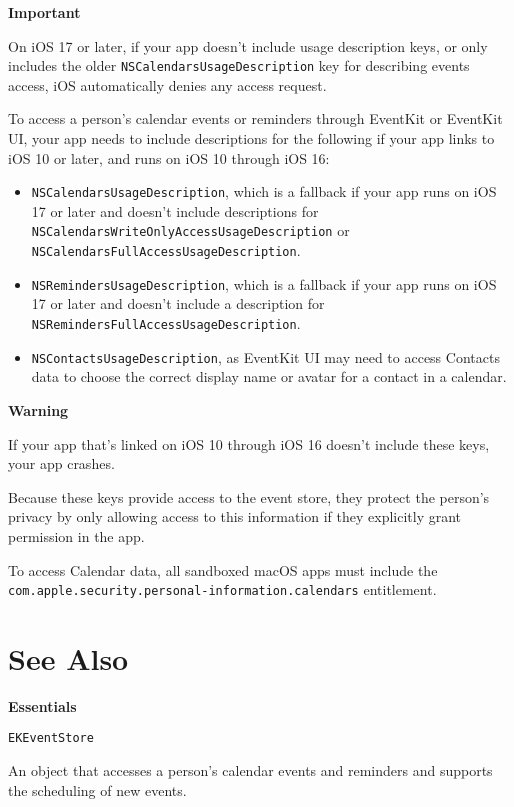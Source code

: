 \documentclass{article}
\begin{document}
\textbf{Important}

On iOS 17 or later, if your app doesn't include usage description keys, or only includes the older \texttt{NSCalendarsUsageDescription} key for describing events access, iOS automatically denies any access request.

To access a person's calendar events or reminders through EventKit or EventKit UI, your app needs to include descriptions for the following if your app links to iOS 10 or later, and runs on iOS 10 through iOS 16:

\begin{itemize}
    \item \texttt{NSCalendarsUsageDescription}, which is a fallback if your app runs on iOS 17 or later and doesn't include descriptions for \texttt{NSCalendarsWriteOnlyAccessUsageDescription} or \texttt{NSCalendarsFullAccessUsageDescription}.
    \item \texttt{NSRemindersUsageDescription}, which is a fallback if your app runs on iOS 17 or later and doesn't include a description for \texttt{NSRemindersFullAccessUsageDescription}.
    \item \texttt{NSContactsUsageDescription}, as EventKit UI may need to access Contacts data to choose the correct display name or avatar for a contact in a calendar.
\end{itemize}

\textbf{Warning}

If your app that's linked on iOS 10 through iOS 16 doesn't include these keys, your app crashes.

Because these keys provide access to the event store, they protect the person's privacy by only allowing access to this information if they explicitly grant permission in the app.

To access Calendar data, all sandboxed macOS apps must include the \texttt{com.apple.security.personal-information.calendars} entitlement.

\section*{See Also}

\textbf{Essentials}

\texttt{EKEventStore}

An object that accesses a person's calendar events and reminders and supports the scheduling of new events.

\newpage
\end{document}
